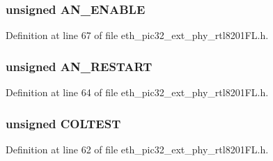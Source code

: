 \hypertarget{union_____b_m_c_o_nbits__t_ac70b16effdab4243521af72c0c4561d2}{}
\subsubsection[{A\+N\+\_\+\+E\+N\+A\+B\+L\+E}]{\setlength{\rightskip}{0pt plus 5cm}unsigned A\+N\+\_\+\+E\+N\+A\+B\+L\+E}\label{union_____b_m_c_o_nbits__t_ac70b16effdab4243521af72c0c4561d2}


Definition at line 67 of file eth\+\_\+pic32\+\_\+ext\+\_\+phy\+\_\+rtl8201\+F\+L.\+h.

\hypertarget{union_____b_m_c_o_nbits__t_a1d18945aae4c125b483cbab7196fa3bc}{}
\subsubsection[{A\+N\+\_\+\+R\+E\+S\+T\+A\+R\+T}]{\setlength{\rightskip}{0pt plus 5cm}unsigned A\+N\+\_\+\+R\+E\+S\+T\+A\+R\+T}\label{union_____b_m_c_o_nbits__t_a1d18945aae4c125b483cbab7196fa3bc}


Definition at line 64 of file eth\+\_\+pic32\+\_\+ext\+\_\+phy\+\_\+rtl8201\+F\+L.\+h.

\hypertarget{union_____b_m_c_o_nbits__t_a9c09d7e7c7ef351fc2b6c37785069ab1}{}
\subsubsection[{C\+O\+L\+T\+E\+S\+T}]{\setlength{\rightskip}{0pt plus 5cm}unsigned C\+O\+L\+T\+E\+S\+T}\label{union_____b_m_c_o_nbits__t_a9c09d7e7c7ef351fc2b6c37785069ab1}


Definition at line 62 of file eth\+\_\+pic32\+\_\+ext\+\_\+phy\+\_\+rtl8201\+F\+L.\+h.

